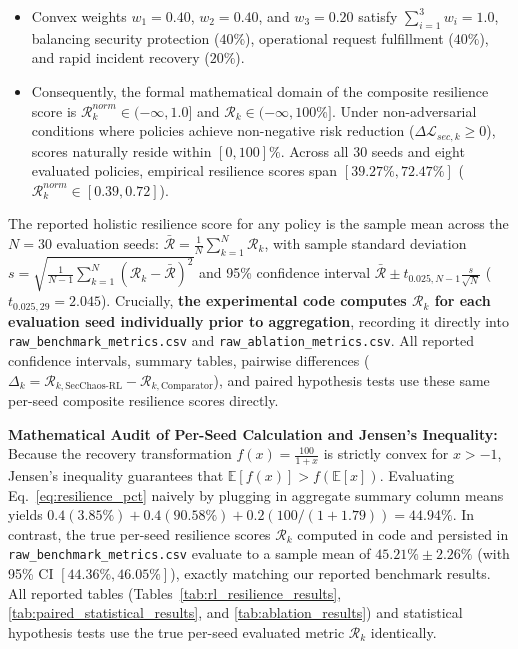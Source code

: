 \documentclass[ASNA,twocolumn]{USG}
\begin{document}
\begin{enumerate}
\begin{itemize}
        \item Convex weights $w_1 = 0.40$, $w_2 = 0.40$, and $w_3 = 0.20$ satisfy $\sum_{i=1}^3 w_i = 1.0$, balancing security protection ($40\%$), operational request fulfillment ($40\%$), and rapid incident recovery ($20\%$).
        \item Consequently, the formal mathematical domain of the composite resilience score is $\mathcal{R}_k^{norm} \in (-\infty, 1.0]$ and $\mathcal{R}_k \in (-\infty, 100\%]$. Under non-adversarial conditions where policies achieve non-negative risk reduction ($\Delta \mathcal{L}_{sec, k} \ge 0$), scores naturally reside within $[0, 100]\%$. Across all 30 seeds and eight evaluated policies, empirical resilience scores span $[39.27\%, 72.47\%]$ ($\mathcal{R}_k^{norm} \in [0.39, 0.72]$).
    \end{itemize}
    The reported holistic resilience score for any policy is the sample mean across the $N=30$ evaluation seeds: $\bar{\mathcal{R}} = \frac{1}{N}\sum_{k=1}^N \mathcal{R}_k$, with sample standard deviation $s = \sqrt{\frac{1}{N-1}\sum_{k=1}^N (\mathcal{R}_k - \bar{\mathcal{R}})^2}$ and 95\% confidence interval $\bar{\mathcal{R}} \pm t_{0.025, N-1} \frac{s}{\sqrt{N}}$ ($t_{0.025, 29} = 2.045$). Crucially, \textbf{the experimental code computes $\mathcal{R}_k$ for each evaluation seed individually prior to aggregation}, recording it directly into \texttt{raw\_benchmark\_metrics.csv} and \texttt{raw\_ablation\_metrics.csv}. All reported confidence intervals, summary tables, pairwise differences ($\Delta_k = \mathcal{R}_{k, \text{SecChaos-RL}} - \mathcal{R}_{k, \text{Comparator}}$), and paired hypothesis tests use these same per-seed composite resilience scores directly.
    
    \textbf{Mathematical Audit of Per-Seed Calculation and Jensen's Inequality:} Because the recovery transformation $f(x) = \frac{100}{1+x}$ is strictly convex for $x > -1$, Jensen's inequality guarantees that $\mathbb{E}[f(x)] > f(\mathbb{E}[x])$. Evaluating Eq.~\eqref{eq:resilience_pct} naively by plugging in aggregate summary column means yields $0.4(3.85\%) + 0.4(90.58\%) + 0.2(100 / (1 + 1.79)) = 44.94\%$. In contrast, the true per-seed resilience scores $\mathcal{R}_k$ computed in code and persisted in \texttt{raw\_benchmark\_metrics.csv} evaluate to a sample mean of $\mathbf{45.21\% \pm 2.26\%}$ (with 95\% CI $[44.36\%, 46.05\%]$), exactly matching our reported benchmark results. All reported tables (Tables~\ref{tab:rl_resilience_results}, \ref{tab:paired_statistical_results}, and \ref{tab:ablation_results}) and statistical hypothesis tests use the true per-seed evaluated metric $\mathcal{R}_k$ identically.
\end{enumerate}
\end{document}

